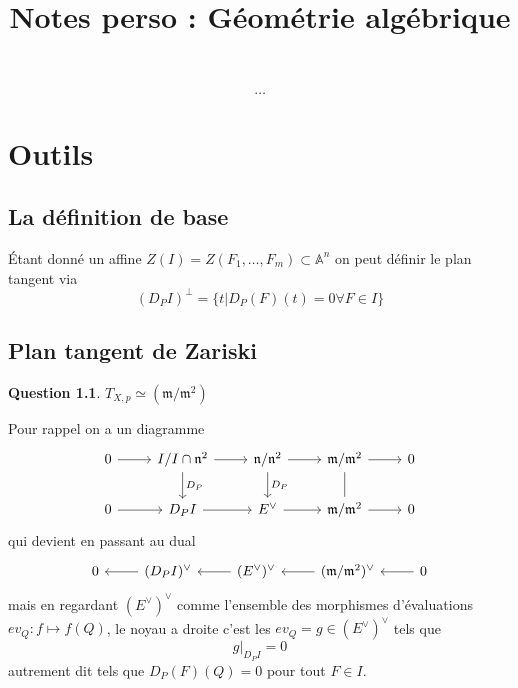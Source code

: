 \documentclass[a4paper,12pt]{book}
\title{Notes perso : Géométrie algébrique}
\date{}
\newcommand{\A}{\mathbb{A}}
\newcommand{\m}{\mathfrak{m}}
\theoremstyle{plain}
\theoremstyle{definition}
\newtheorem{quest}{Question}
\theoremstyle{remark}
\begin{document}
\maketitle
\tableofcontents
\[\ldots\]   

\chapter{Outils}
\section{La définition de base}
Étant donné un affine $Z(I)=Z(F_1,\ldots, F_m)\subset\A^n$ 
on peut définir le plan tangent via
\[(D_PI)^\perp =\{t| D_P(F)(t)=0 \forall F\in I\}\]
\section{Plan tangent de Zariski}
\begin{quest}
    $T_{X,p}\simeq (\m/\m^2)$
\end{quest}
Pour rappel on a un diagramme 
\[\begin{tikzcd}
	0 & {I/I\cap \mathfrak n^2} & {\mathfrak n/\mathfrak n^2} & {\mathfrak m/\mathfrak m^2} & 0 \\
	0 & {D_PI} & {E^\vee} & {\mathfrak m/\mathfrak m^2} & 0
	\arrow[from=1-1, to=1-2]
	\arrow[from=1-2, to=1-3]
	\arrow["{D_P}", from=1-2, to=2-2]
	\arrow[from=1-3, to=1-4]
	\arrow["{D_P}", from=1-3, to=2-3]
	\arrow[from=1-4, to=1-5]
	\arrow[no head, from=1-4, to=2-4]
	\arrow[from=2-1, to=2-2]
	\arrow[from=2-2, to=2-3]
	\arrow[from=2-3, to=2-4]
	\arrow[from=2-4, to=2-5]
\end{tikzcd}\]
qui devient en passant au dual
\[\begin{tikzcd}
	0 & {(D_PI)^\vee} & {(E^\vee)^\vee} & {(\mathfrak m/\mathfrak m^2)^\vee} & 0
	\arrow[from=1-2, to=1-1]
	\arrow[from=1-3, to=1-2]
	\arrow[from=1-4, to=1-3]
	\arrow[from=1-5, to=1-4]
\end{tikzcd}\]
mais en regardant $(E^\vee)^\vee$ comme l'ensemble des
morphismes d'évaluations $ev_Q\colon f\mapsto f(Q)$, le noyau 
a droite c'est les $ev_Q=g\in(E^\vee)^\vee$ tels que 
\[g|_{D_PI}=0\] autrement dit tels que $D_P(F)(Q)=0$ pour tout
$F\in I$.
\end{document}
